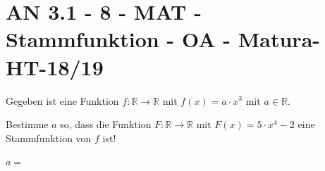 \section{AN 3.1 - 8 - MAT - Stammfunktion - OA - Matura-HT-18/19}

\begin{beispiel}[AN 3.1]{1}
Gegeben ist eine Funktion $f\!:\mathbb{R}\rightarrow\mathbb{R}$ mit $f(x)=a\cdot x^3$ mit $a\in\mathbb{R}$.

Bestimme $a$ so, dass die Funktion $F\!:\mathbb{R}\rightarrow\mathbb{R}$ mit $F(x)=5\cdot x^4-2$ eine Stammfunktion von $f$ ist!\leer

$a=$\,
\end{beispiel}